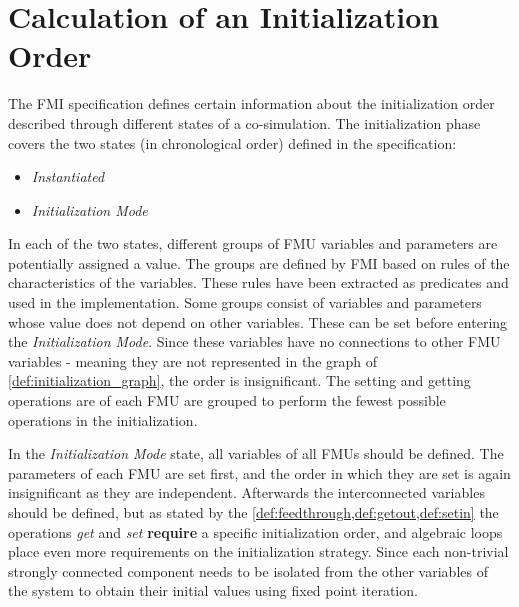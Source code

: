 \section{Calculation of an Initialization Order}\label{sc:initilization}
The FMI specification defines certain information about the initialization order described through different states of a co-simulation. The initialization phase covers the two states (in chronological order) defined in the specification:
\begin{itemize}
    \item \textit{Instantiated}
    \item \textit{Initialization Mode}
\end{itemize}
In each of the two states, different groups of FMU variables and parameters are potentially assigned a value. The groups are defined by FMI based on rules of the characteristics of the variables. These rules have been extracted as predicates and used in the implementation. 
Some groups consist of variables and parameters whose value does not depend on other variables. These can be set before entering the \textit{Initialization Mode}. Since these variables have no connections to other FMU variables - meaning they are not represented in the graph of \cref{def:initialization_graph}, the order is insignificant. 
The setting and getting operations are of each FMU are grouped to perform the fewest possible operations in the initialization. 

In the \textit{Initialization Mode} state, all variables of all FMUs should be defined.
The parameters of each FMU are set first, and the order in which they are set is again insignificant as they are independent.
Afterwards the interconnected variables should be defined, but as stated by the \cref{def:feedthrough,def:getout,def:setin} the operations \textit{get} and \textit{set} \textbf{require} a specific initialization order, and algebraic loops place even more requirements on the initialization strategy. Since each non-trivial strongly connected component needs to be isolated from the other variables of the system to obtain their initial values using fixed point iteration. 


